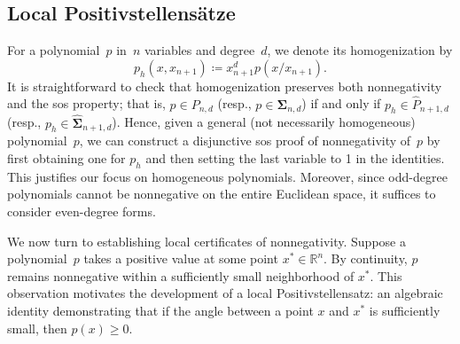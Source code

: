 \documentclass[12pt]{article}
\newcommand{\NN}{P}
\newcommand{\SOS}{\mathbf{\Sigma}}
\newcommand{\HNN}{\widehat{P}}
\newcommand{\HSOS}{\widehat{\mathbf{\Sigma}}}
\newcommand{\defeq}{\coloneq}
\theoremstyle{remark}
\begin{document}



\subsection{Local Positivstellens\"atze}\label{sec:local_psatz}
For a polynomial~$p$ in~$n$ variables and degree~$d$, we denote its homogenization by
$$p_h(x,x_{n+1})\defeq x_{n+1}^dp(x/x_{n+1}).$$
It is straightforward to check that homogenization preserves both nonnegativity and the sos property; that is, $p\in\NN_{n,d}$ (resp., $p\in\SOS_{n,d}$) if and only if $p_h\in\HNN_{n+1,d}$ (resp., $p_h\in\HSOS_{n+1,d}$). Hence, given a general (not necessarily homogeneous) polynomial~$p$, we can construct a disjunctive sos proof of nonnegativity of~$p$ by first obtaining one for $p_h$ and then setting the last variable to 1 in the identities. This justifies our focus on homogeneous polynomials. Moreover, since odd-degree polynomials cannot be nonnegative on the entire Euclidean space, it suffices to consider even-degree forms. 

We now turn to establishing local certificates of nonnegativity. Suppose a polynomial~$p$ takes {a} positive value at some point $x^*\in\mathbb{R}^n$. By continuity, $p$ remains nonnegative within a sufficiently small neighborhood of $x^*$. This observation motivates the development of a local Positivstellensatz: an algebraic identity demonstrating that if the angle between a point $x$ and $x^*$ is sufficiently small, then $p(x)\ge 0$. 
\end{document}
